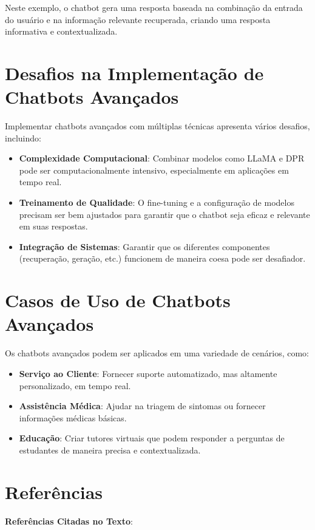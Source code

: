 \documentclass[14pt,a4paper,oneside]{book}
\begin{document}
Neste exemplo, o chatbot gera uma resposta baseada na combinação da entrada do usuário e na informação relevante recuperada, criando uma resposta informativa e contextualizada.

\section{Desafios na Implementação de Chatbots Avançados}

Implementar chatbots avançados com múltiplas técnicas apresenta vários desafios, incluindo:

\begin{itemize}
	\item \textbf{Complexidade Computacional}: Combinar modelos como LLaMA e DPR pode ser computacionalmente intensivo, especialmente em aplicações em tempo real.
	\item \textbf{Treinamento de Qualidade}: O fine-tuning e a configuração de modelos precisam ser bem ajustados para garantir que o chatbot seja eficaz e relevante em suas respostas.
	\item \textbf{Integração de Sistemas}: Garantir que os diferentes componentes (recuperação, geração, etc.) funcionem de maneira coesa pode ser desafiador.
\end{itemize}

\section{Casos de Uso de Chatbots Avançados}

Os chatbots avançados podem ser aplicados em uma variedade de cenários, como:

\begin{itemize}
	\item \textbf{Serviço ao Cliente}: Fornecer suporte automatizado, mas altamente personalizado, em tempo real.
	\item \textbf{Assistência Médica}: Ajudar na triagem de sintomas ou fornecer informações médicas básicas.
	\item \textbf{Educação}: Criar tutores virtuais que podem responder a perguntas de estudantes de maneira precisa e contextualizada.
\end{itemize}

\section{Referências}

\textbf{Referências Citadas no Texto}:
\end{document}
